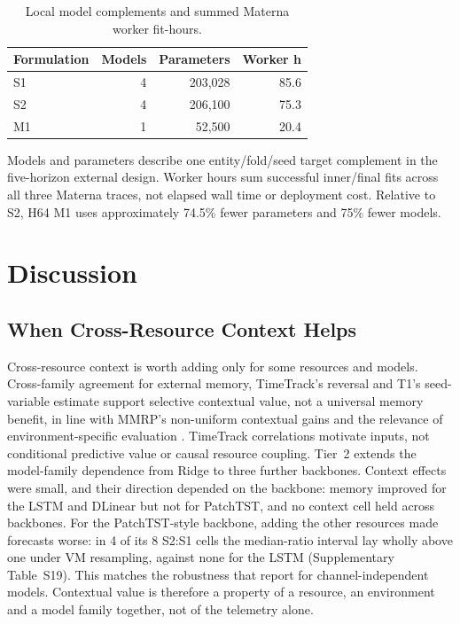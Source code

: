 \documentclass[5p,twocolumn]{elsarticle}
\begin{document}
\begin{table}[t]
  \caption{Local model complements and summed Materna worker fit-hours.}
  \label{tab:efficiency}
  \centering
  \small
  \begin{tabular}{@{}lrrr@{}}
    \toprule
    Formulation & Models & Parameters & Worker h \\
    \midrule
    S1 & 4 & 203,028 & 85.6 \\
    S2 & 4 & 206,100 & 75.3 \\
    M1 & 1 &  52,500 & 20.4 \\
    \bottomrule
  \end{tabular}

  \vspace{2pt}
  \parbox{\columnwidth}{\footnotesize Models and parameters describe one
  entity/fold/seed target complement in the five-horizon external design.
  Worker hours sum successful inner/final fits across all three Materna
  traces, not elapsed wall time or deployment cost. Relative to S2, H64 M1
  uses approximately 74.5\% fewer parameters and 75\% fewer models.}
\end{table}

\section{Discussion}
\label{sec:discussion}

\subsection{When Cross-Resource Context Helps}
\label{sec:discussion-context}

Cross-resource context is worth adding only for some resources and models.
Cross-family agreement for external memory, TimeTrack's reversal and T1's
seed-variable estimate support selective contextual value, not a universal
memory benefit, in line with MMRP's non-uniform contextual gains
\citep{Tripathi2025MMRP} and the relevance of environment-specific evaluation
\citep{Rossi2025CloudUncertainty}. TimeTrack correlations
\citep{Meliani2025TimeTrack} motivate inputs, not conditional predictive value
or causal resource coupling.
Tier~2 extends the model-family dependence from Ridge to three further
backbones. Context effects were small, and their direction depended on the
backbone: memory improved for the LSTM and DLinear but not for PatchTST, and
no context cell held across backbones. For the PatchTST-style backbone, adding
the other resources made forecasts worse: in 4 of its 8 S2:S1 cells the
median-ratio interval lay wholly above one under VM resampling, against none
for the LSTM (Supplementary Table~S19). This matches the robustness that
\citet{Han2024ChannelIndependent} report for channel-independent models.
Contextual value is therefore a
property of a resource, an environment and a model family together, not of
the telemetry alone.
\end{document}
